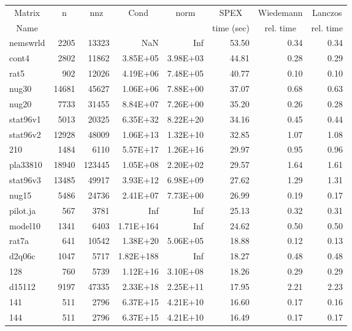 \documentclass[10pt]{article}
\begin{document}
\newpage
\begin{longtable}{|l|r|r|r|r|r|r|r|}
\hline	
\multicolumn{1}{|c|}{Matrix} &
\multicolumn{1}{c|}{n} &
\multicolumn{1}{c|}{nnz} &
\multicolumn{1}{c|}{Cond} &
\multicolumn{1}{c|}{norm} &
\multicolumn{1}{c|}{SPEX} &
\multicolumn{1}{c|}{Wiedemann} &
\multicolumn{1}{c|}{Lanczos}  \\
\multicolumn{1}{|c|}{Name} &
\multicolumn{1}{c|}{ } &
\multicolumn{1}{c|}{ } &
\multicolumn{1}{c|}{ } &
\multicolumn{1}{c|}{ } &
\multicolumn{1}{c|}{time (sec)} &
\multicolumn{1}{c|}{rel. time} &
\multicolumn{1}{c|}{rel. time } \\
\hline
\endhead
nemswrld	&	2205	&	13323	&	NaN	&	Inf	&	53.50	&	0.34	&	0.34	\\
cont4	&	2802	&	11862	&	3.85E+05	&	3.98E+03	&	44.81	&	0.28	&	0.29	\\
rat5	&	902	&	12026	&	4.19E+06	&	7.48E+05	&	40.77	&	0.10	&	0.10	\\
nug30	&	14681	&	45627	&	1.06E+06	&	7.88E+00	&	37.07	&	0.68	&	0.63	\\
nug20	&	7733	&	31455	&	8.84E+07	&	7.26E+00	&	35.20	&	0.26	&	0.28	\\
stat96v1	&	5013	&	20325	&	6.35E+32	&	8.22E+20	&	34.16	&	0.45	&	0.44	\\
stat96v2	&	12928	&	48009	&	1.06E+13	&	1.32E+10	&	32.85	&	1.07	&	1.08	\\
210	&	1484	&	6110	&	5.57E+17	&	1.26E+16	&	29.97	&	0.95	&	0.96	\\
pla33810	&	18940	&	123445	&	1.05E+08	&	2.20E+02	&	29.57	&	1.64	&	1.61	\\
stat96v3	&	13485	&	49917	&	3.93E+12	&	6.98E+09	&	27.62	&	1.29	&	1.31	\\
nug15	&	5486	&	24736	&	2.41E+07	&	7.73E+00	&	26.99	&	0.19	&	0.17	\\
pilot.ja	&	567	&	3781	&	Inf	&	Inf	&	25.13	&	0.32	&	0.31	\\
model10	&	1341	&	6403	&	1.71E+164	&	Inf	&	24.62	&	0.50	&	0.50	\\
rat7a	&	641	&	10542	&	1.38E+20	&	5.06E+05	&	18.88	&	0.12	&	0.13	\\
d2q06c	&	1047	&	5717	&	1.82E+188	&	Inf	&	18.27	&	0.48	&	0.48	\\
128	&	760	&	5739	&	1.12E+16	&	3.10E+08	&	18.26	&	0.29	&	0.29	\\
d15112	&	9197	&	47335	&	2.33E+18	&	2.25E+11	&	17.95	&	2.21	&	2.23	\\
141	&	511	&	2796	&	6.37E+15	&	4.21E+10	&	16.60	&	0.17	&	0.16	\\
144	&	511	&	2796	&	6.37E+15	&	4.21E+10	&	16.49	&	0.17	&	0.17	\\

\end{longtable}
\end{document}
